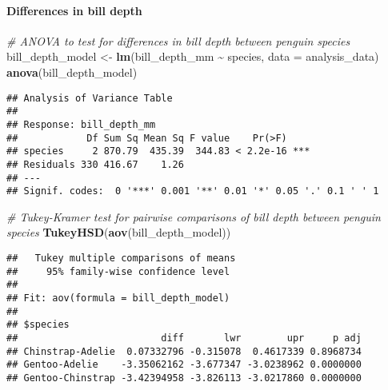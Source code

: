 \documentclass[
]{article}
\newenvironment{Shaded}{\begin{snugshade}}{\end{snugshade}}
\newcommand{\AttributeTok}[1]{\textcolor[rgb]{0.13,0.29,0.53}{#1}}
\newcommand{\CommentTok}[1]{\textcolor[rgb]{0.56,0.35,0.01}{\textit{#1}}}
\newcommand{\FunctionTok}[1]{\textcolor[rgb]{0.13,0.29,0.53}{\textbf{#1}}}
\newcommand{\NormalTok}[1]{#1}
\newcommand{\OtherTok}[1]{\textcolor[rgb]{0.56,0.35,0.01}{#1}}
\newcommand{\SpecialCharTok}[1]{\textcolor[rgb]{0.81,0.36,0.00}{\textbf{#1}}}
\begin{document}
\paragraph{Differences in bill depth}\label{differences-in-bill-depth}

\begin{Shaded}
\begin{Highlighting}[]
\CommentTok{\# ANOVA to test for differences in bill depth between penguin species}
\NormalTok{bill\_depth\_model }\OtherTok{\textless{}{-}} \FunctionTok{lm}\NormalTok{(bill\_depth\_mm }\SpecialCharTok{\textasciitilde{}}\NormalTok{ species, }\AttributeTok{data =}\NormalTok{ analysis\_data)}
\FunctionTok{anova}\NormalTok{(bill\_depth\_model)}
\end{Highlighting}
\end{Shaded}

\begin{verbatim}
## Analysis of Variance Table
## 
## Response: bill_depth_mm
##            Df Sum Sq Mean Sq F value    Pr(>F)    
## species     2 870.79  435.39  344.83 < 2.2e-16 ***
## Residuals 330 416.67    1.26                      
## ---
## Signif. codes:  0 '***' 0.001 '**' 0.01 '*' 0.05 '.' 0.1 ' ' 1
\end{verbatim}

\begin{Shaded}
\begin{Highlighting}[]
\CommentTok{\# Tukey{-}Kramer test for pairwise comparisons of bill depth between penguin species}
\FunctionTok{TukeyHSD}\NormalTok{(}\FunctionTok{aov}\NormalTok{(bill\_depth\_model))}
\end{Highlighting}
\end{Shaded}

\begin{verbatim}
##   Tukey multiple comparisons of means
##     95% family-wise confidence level
## 
## Fit: aov(formula = bill_depth_model)
## 
## $species
##                         diff       lwr        upr     p adj
## Chinstrap-Adelie  0.07332796 -0.315078  0.4617339 0.8968734
## Gentoo-Adelie    -3.35062162 -3.677347 -3.0238962 0.0000000
## Gentoo-Chinstrap -3.42394958 -3.826113 -3.0217860 0.0000000
\end{verbatim}
\end{document}
